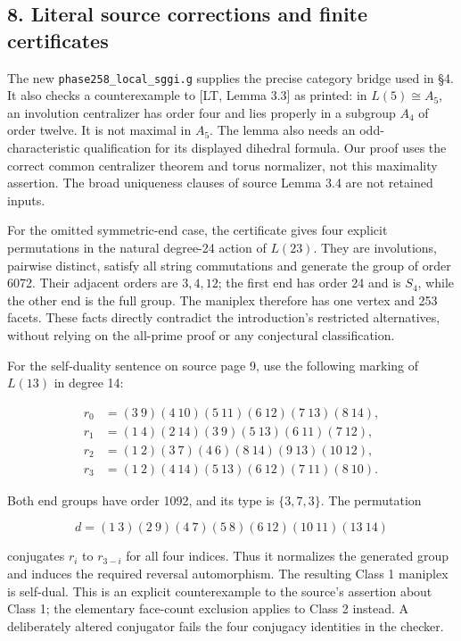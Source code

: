 \documentclass[
  11pt,
]{article}
\begin{document}
\subsection{8. Literal source corrections and finite
certificates}\label{literal-source-corrections-and-finite-certificates}

The new \texttt{phase258\_local\_sggi.g} supplies the precise category
bridge used in §4. It also checks a counterexample to {[}LT, Lemma
3.3{]} as printed: in \(L(5)\cong A_5\), an involution centralizer has
order four and lies properly in a subgroup \(A_4\) of order twelve. It
is not maximal in \(A_5\). The lemma also needs an odd-characteristic
qualification for its displayed dihedral formula. Our proof uses the
correct common centralizer theorem and torus normalizer, not this
maximality assertion. The broad uniqueness clauses of source Lemma 3.4
are not retained inputs.

For the omitted symmetric-end case, the certificate gives four explicit
permutations in the natural degree-24 action of \(L(23)\). They are
involutions, pairwise distinct, satisfy all string commutations and
generate the group of order 6072. Their adjacent orders are \(3,4,12\);
the first end has order 24 and is \(S_4\), while the other end is the
full group. The maniplex therefore has one vertex and 253 facets. These
facts directly contradict the introduction's restricted alternatives,
without relying on the all-prime proof or any conjectural
classification.

For the self-duality sentence on source page 9, use the following
marking of \(L(13)\) in degree 14:

\[\begin{aligned}
r_0&=(3\ 9)(4\ 10)(5\ 11)(6\ 12)(7\ 13)(8\ 14),\\
r_1&=(1\ 4)(2\ 14)(3\ 9)(5\ 13)(6\ 11)(7\ 12),\\
r_2&=(1\ 2)(3\ 7)(4\ 6)(8\ 14)(9\ 13)(10\ 12),\\
r_3&=(1\ 2)(4\ 14)(5\ 13)(6\ 12)(7\ 11)(8\ 10).
\end{aligned}\tag{6}\]

Both end groups have order 1092, and its type is \(\{3,7,3\}\). The
permutation

\[d=(1\ 3)(2\ 9)(4\ 7)(5\ 8)(6\ 12)(10\ 11)(13\ 14)\tag{7}\]

conjugates \(r_i\) to \(r_{3-i}\) for all four indices. Thus it
normalizes the generated group and induces the required reversal
automorphism. The resulting Class 1 maniplex is self-dual. This is an
explicit counterexample to the source's assertion about Class 1; the
elementary face-count exclusion applies to Class 2 instead. A
deliberately altered conjugator fails the four conjugacy identities in
the checker.
\end{document}
